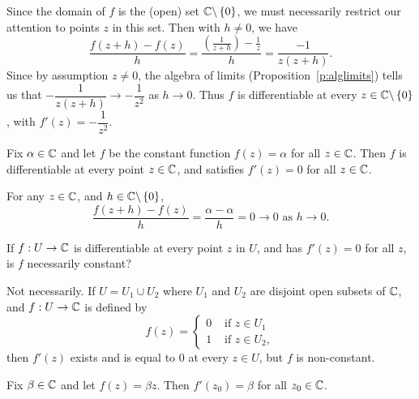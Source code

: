 \begin{solution}
Since the domain of $f$ is the (open) set $\mathbb{C} \backslash \left\{0\right\}$, we must necessarily restrict our attention to points $z$ in this set.  Then with $h \neq 0$, we have
\[
\frac{f(z+h)-f(z)}{h} = \frac{\left( \frac{1}{z+h} \right) - \frac{1}{z}}{h} = \frac{-1}{z(z+h)}.
\]
Since by assumption $z \neq 0$, the algebra of limits (Proposition~\ref{p:alglimits}) tells us that $-\dfrac{1}{z(z+h)} \to - \dfrac{1}{z^2}$ as $h \to 0$.  Thus $f$ is differentiable at every $z \in \mathbb{C} \backslash \left\{0\right\}$, with $f'(z) = -\dfrac{1}{z^2}$.
\end{solution}

\begin{example}
\label{e:diff4}
Fix $\alpha \in \mathbb{C}$ and let $f$ be the constant function $f(z) = \alpha$ for all $z \in \mathbb{C}$.  Then $f$ is differentiable at every point $z \in \mathbb{C}$, and satisfies $f'(z)=0$ for all $z \in \mathbb{C}$.
\end{example}
\begin{solution}
For any $z\in \mathbb{C}$, and $h \in \mathbb{C} \backslash \left\{0\right\}$,
\[
\frac{f(z+h)-f(z)}{h} = \frac{\alpha-\alpha}{h}=0 \to 0 \text{ as } h \to 0.
\]
\end{solution}

\begin{question}
If $f:U \to \mathbb{C}$ is differentiable at every point $z$ in $U$, and has $f'(z)=0$ for all $z$, is $f$ necessarily constant?
\end{question}

\begin{answer}
Not necessarily.  If $U=U_1 \cup U_2$ where $U_1$ and $U_2$ are disjoint open subsets of $\mathbb{C}$, and $f:U \to \mathbb{C}$ is defined by
\[
f(z) = \begin{cases}
0 & \text{ if } z \in U_1 \\
1& \text{ if } z \in U_2,
\end{cases}
\]
then $f'(z)$ exists and is equal to $0$ at every $z \in U$, but $f$ is non-constant.
\end{answer}

\begin{example}
\label{e:diff5}
Fix $\beta \in \mathbb{C}$ and let $f(z)=\beta z$.  Then $f'(z_0) = \beta$ for all $z_0 \in \mathbb{C}$.
\end{example}

\begin{comment}
\begin{solution}
\[
\frac{f(z+h)-f(z)}{h} = \frac{\beta(z+h)-\beta z}{h}=\beta  \to 0 \text{ as } h \to 0.
\]
\end{solution}
\end{comment}

